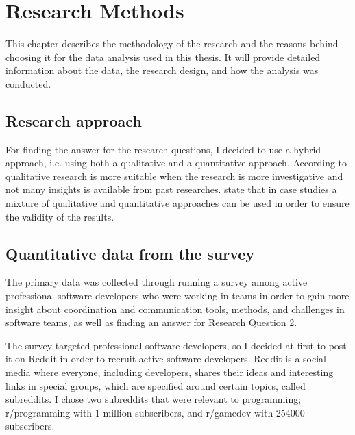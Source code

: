 \chapter{Research Methods}

This chapter describes the methodology of the research and the reasons behind choosing it for the data analysis used in this thesis. It will provide detailed information about the data, the research design, and how the analysis was conducted.

\section{Research approach}

For finding the answer for the research questions, I decided to use a hybrid approach, i.e. using both a qualitative and a quantitative approach. According to \citet{Ghauri2010} qualitative research is more suitable when the research is more investigative and not many insights is available from past researches. 
\citet{ Stray2012a} state that in case studies a mixture of qualitative and quantitative approaches can be used in order to ensure the validity of the results.  

\section{Quantitative data from the survey}

The primary data was collected through running a survey among active professional software developers who were working in teams in order to gain more insight about coordination and communication tools, methods, and challenges in software teams, as well as finding an answer for Research Question 2.

The survey targeted professional software developers, so I decided at first to post it on Reddit in order to recruit active software developers. Reddit is a social media where everyone, including developers, shares their ideas and interesting links in special groups, which are specified around certain topics, called subreddits. I chose two subreddits that were relevant to programming; r/programming with 1 million subscribers, and r/gamedev with 254000 subscribers.


